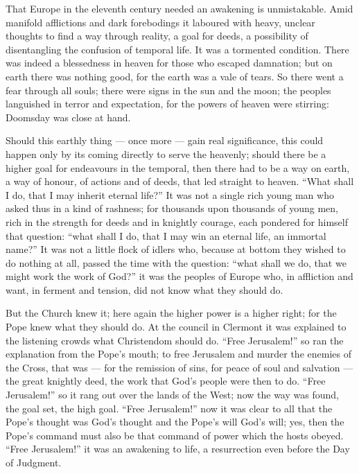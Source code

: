 \documentclass[12pt,a4paper,openany]{book}
\newcommand{\opage}[1]{\marginnote{\footnotesize\textit{[#1]}}}
\begin{document}
\opage{8}That Europe in the eleventh century needed an awakening
is unmistakable. Amid manifold afflictions
and dark forebodings it laboured with heavy, unclear thoughts to
find a way through reality, a goal for deeds,
a possibility of disentangling the confusion of temporal life. It was
a tormented condition. There was indeed a blessedness in heaven
for those who escaped damnation; but on earth there was
nothing good, for the earth was a vale of tears. So
there went a fear through all souls; there were signs in the sun
and the moon; the peoples languished in terror and expectation, for
the powers of heaven were stirring: Doomsday was close at hand.

Should this earthly thing --- once more --- gain real
significance, this could happen only by its coming
directly to serve the heavenly; should there be a
higher goal for endeavours in the temporal, then there had to
be a way on earth, a way of honour, of actions and
of deeds, that led straight to heaven. ``What shall
I do, that I may inherit eternal life?'' It was not a
single rich young man who asked thus in a kind of rashness;
for thousands upon thousands of young men, rich in the strength for deeds
and in knightly courage, each pondered for himself that
question: ``what shall I do, that I may win an
eternal life, an immortal name?'' It was not a little flock of %
idlers who, because at bottom they wished to do nothing at all,
passed the time with the question: ``what shall we
do, that we might work the work of God?'' it was the peoples of Europe
who, in affliction and want, in ferment and tension,
did not know what they should do.

But the Church knew it; here again the higher power is
a higher right; for the Pope knew what they should do. At
the council in Clermont it was explained to the listening
crowds what Christendom should do. ``Free
Jerusalem!'' so ran the explanation from the Pope's mouth; to free
\opage{9}Jerusalem and murder the enemies of the Cross, that was --- for the remission of sins,
for peace of soul and salvation --- the great
knightly deed, the work that God's people were then to do.
``Free Jerusalem!'' so it rang out over the lands of the West; now
the way was found, the goal set, the high goal. ``Free
Jerusalem!'' now it was clear to all that the Pope's thought was
God's thought and the Pope's will God's will; yes, then
the Pope's command must also be that command of power which the hosts
obeyed. ``Free Jerusalem!'' it was an awakening to life,
a resurrection even before the Day of Judgment. %
\end{document}
